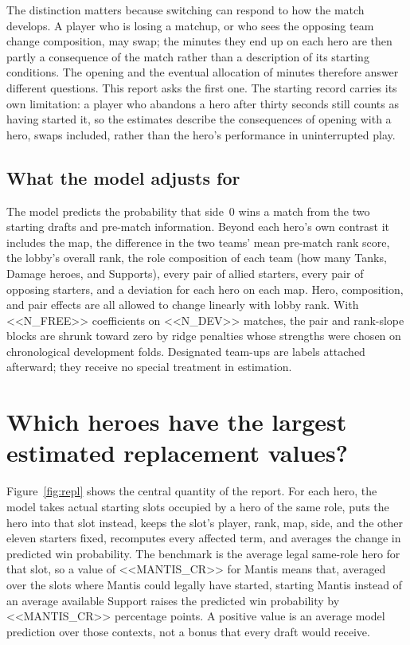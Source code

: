 \documentclass[11pt]{article}
\begin{document}
The distinction matters because switching can respond to how the match develops. A player who is
losing a matchup, or who sees the opposing team change composition, may swap; the minutes they end up on
each hero are then partly a consequence of the match rather than a description of its starting
conditions. The opening and the eventual allocation of minutes therefore answer different questions. This
report asks the first one. The starting record carries its own limitation: a player who abandons a hero
after thirty seconds still counts as having started it, so the estimates describe the consequences of
opening with a hero, swaps included, rather than the hero's performance in uninterrupted play.

\subsection*{What the model adjusts for}

The model predicts the probability that side~0 wins a match from the two starting drafts and pre-match
information. Beyond each hero's own contrast it includes the map, the difference in the two teams' mean
pre-match rank score, the lobby's overall rank, the role composition of each team (how many Tanks, Damage
heroes, and Supports), every pair of allied starters, every pair of opposing starters, and a deviation for
each hero on each map. Hero, composition, and pair effects are all allowed to change linearly with lobby
rank. With <<N_FREE>> coefficients on <<N_DEV>> matches, the pair and rank-slope blocks are shrunk toward
zero by ridge penalties whose strengths were chosen on chronological development folds. Designated
team-ups are labels attached afterward; they receive no special treatment in estimation.

\section*{Which heroes have the largest estimated replacement values?}

Figure~\ref{fig:repl} shows the central quantity of the report. For each hero,
the model takes actual starting slots occupied by a hero of the same role, puts the hero into that slot
instead, keeps the slot's player, rank, map, side, and the other eleven starters fixed, recomputes every
affected term, and averages the change in predicted win probability. The benchmark is the average legal
same-role hero for that slot, so a value of <<MANTIS_CR>> for Mantis means that, averaged over the slots
where Mantis could legally have started, starting Mantis instead of an average available Support raises
the predicted win probability by <<MANTIS_CR>> percentage points. A positive value is an average model
prediction over those contexts, not a bonus that every draft would receive.
\end{document}
